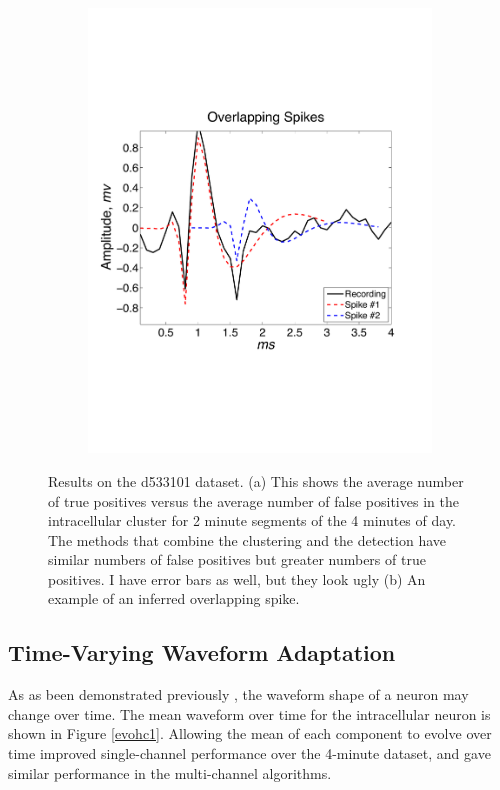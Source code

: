 \begin{center}
\begin{figure}
\begin{subfigure}[b]{.49\textwidth}
\includegraphics[width=\textwidth]{../figs/alloverlappingspikes/olspike3}
\caption{}
\label{overlapping}
\end{subfigure}



\caption{Results on the d533101 dataset.  (a) This shows the average number of true positives versus the average number of false positives in the intracellular cluster for 2 minute segments of the 4 minutes of day.  The methods that combine the clustering and the detection have similar numbers of false positives but greater numbers of true positives. {\color{red} I have error bars as well, but they look ugly}  (b) An example of an inferred overlapping spike.}
\end{figure}
\end{center}

\subsection{Time-Varying Waveform Adaptation} \label{sub:adapt}
As as been demonstrated previously \cite{calabrese2011kalman}, the waveform shape of a neuron may change over time.  The mean waveform over time for the intracellular neuron is shown in Figure \ref{evohc1}.  Allowing the mean of each component to evolve over time improved single-channel performance over the 4-minute dataset, and gave similar performance in the multi-channel algorithms.
